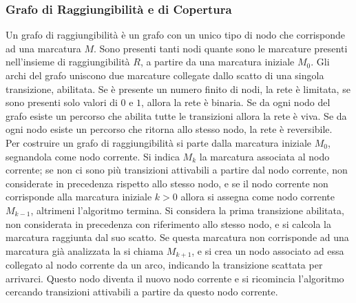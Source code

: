 \documentclass{article}
\numberwithin{equation}{subsection}
\begin{document}
\subsubsection{Grafo di Raggiungibilità e di Copertura}

Un grafo di raggiungibilità è un grafo con un unico tipo di nodo che corrisponde ad una marcatura $M$. Sono presenti tanti nodi quante sono le marcature presenti nell'insieme 
di raggiungibilità $R$, a partire da una marcatura iniziale $M_0$. Gli archi del grafo uniscono due marcature collegate dallo scatto di una singola transizione, abilitata. 
Se è presente un numero finito di nodi, la rete è limitata, se sono presenti solo valori di $0$ e $1$, allora la rete è binaria. Se da ogni nodo del grafo esiste un percorso 
che abilita tutte le transizioni allora la rete è viva. Se da ogni nodo esiste un percorso che ritorna allo stesso nodo, la rete è reversibile. 
\\
Per costruire un grafo di raggiungibilità si parte dalla marcatura iniziale $M_0$, segnandola come nodo corrente. Si indica $M_k$ la marcatura associata al nodo corrente; 
se non ci sono più transizioni attivabili a partire dal nodo corrente, non considerate in precedenza rispetto allo stesso nodo, e se il nodo corrente non corrisponde alla 
marcatura iniziale $k>0$ allora si assegna come nodo corrente $M_{k-1}$, altrimeni l'algoritmo termina. Si considera la prima transizione abilitata, non considerata in precedenza 
con riferimento allo stesso nodo, e si calcola la marcatura raggiunta dal suo scatto. Se questa marcatura non corrisponde ad una marcatura già analizzata la si chiama $M_{k+1}$, 
e si crea un nodo associato ad essa collegato al nodo corrente da un arco, indicando la transizione scattata per arrivarci. Questo nodo diventa il nuovo nodo corrente e si 
ricomincia l'algoritmo cercando transizioni attivabili a partire da questo nodo corrente.  
\begin{center}
\end{center}
\end{document}
